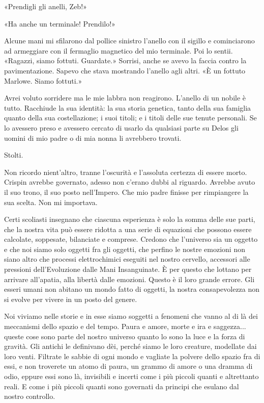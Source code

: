 «Prendigli gli anelli, Zeb!»

«Ha anche un terminale! Prendilo!»

Alcune mani mi sfilarono dal pollice sinistro l'anello con il sigillo e
cominciarono ad armeggiare con il fermaglio magnetico del mio terminale.
Poi lo sentii. «Ragazzi, siamo fottuti. Guardate.» Sorrisi, anche se
avevo la faccia contro la pavimentazione. Sapevo che stava mostrando
l'anello agli altri. «È un fottuto Marlowe. Siamo fottuti.»

Avrei voluto sorridere ma le mie labbra non reagirono. L'anello di un
nobile è tutto. Racchiude la sua identità: la sua storia genetica, tanto
della sua famiglia quanto della sua costellazione; i suoi titoli; e i
titoli delle sue tenute personali. Se lo avessero preso e avessero
cercato di usarlo da qualsiasi parte su Delos gli uomini di mio padre o
di mia nonna li avrebbero trovati.

Stolti.

Non ricordo nient'altro, tranne l'oscurità e l'assoluta certezza di
essere morto. Crispin avrebbe governato, adesso non c'erano dubbi al
riguardo. Avrebbe avuto il suo trono, il suo posto nell'Impero. Che mio
padre finisse per rimpiangere la sua scelta. Non mi importava.

Certi scoliasti insegnano che ciascuna esperienza è solo la somma delle
sue parti, che la nostra vita può essere ridotta a una serie di
equazioni che possono essere calcolate, soppesate, bilanciate e
comprese. Credono che l'universo sia un oggetto e che noi siamo solo
oggetti fra gli oggetti, che perfino le nostre emozioni non siano altro
che processi elettrochimici eseguiti nel nostro cervello, accessori alle
pressioni dell'Evoluzione dalle Mani Insanguinate. È per questo che
lottano per arrivare all'apatia, alla libertà dalle emozioni. Questo è
il loro grande errore. Gli esseri umani non abitano un mondo fatto di
oggetti, la nostra consapevolezza non si evolve per vivere in un posto
del genere.

Noi viviamo nelle storie e in esse siamo soggetti a fenomeni che vanno
al di là dei meccanismi dello spazio e del tempo. Paura e amore, morte e
ira e saggezza... queste cose sono parte del nostro universo quanto lo
sono la luce e la forza di gravità. Gli antichi le definivano dèi,
perché siamo le loro creature, modellate dai loro venti. Filtrate le
sabbie di ogni mondo e vagliate la polvere dello spazio fra di essi, e
non troverete un atomo di paura, un grammo di amore o una dramma di
odio, eppure essi sono là, invisibili e incerti come i più piccoli
quanti e altrettanto reali. E come i più piccoli quanti sono governati
da principi che esulano dal nostro controllo.

